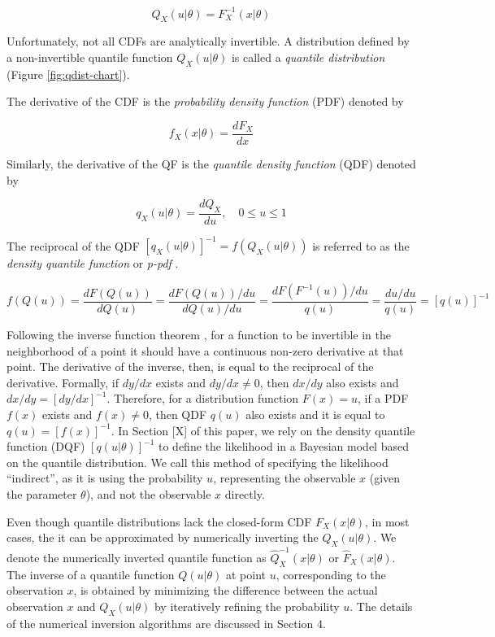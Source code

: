 \documentclass[
  12pt,
]{article}
\begin{document}
\[
Q_X(u | \theta)=F_X^{-1}(x|\theta)
\]

Unfortunately, not all CDFs are analytically invertible. A distribution defined by a non-invertible quantile function \(Q_X(u | \theta)\) is called a \emph{quantile distribution} (Figure \ref{fig:qdist-chart})\citep{gilchrist2000StatisticalModellingQuantile}.

The derivative of the CDF is the \emph{probability density function} (PDF) denoted by

\[
f_X(x | \theta)=\frac{dF_X}{dx}
\]

Similarly, the derivative of the QF is the \emph{quantile density function} (QDF) denoted by

\[
q_X(u|\theta)=\frac{dQ_X}{du}, \quad 0 \leq u \leq 1
\]

The reciprocal of the QDF \([q_X(u|\theta)]^{-1}=f(Q_X(u|\theta))\) is referred to as the \emph{density quantile function} \citep{parzen1980DataModelingUsing} or \emph{p-pdf} \citep{gilchrist2000StatisticalModellingQuantile}.

\[
f(Q(u))=\frac{dF(Q(u))}{dQ(u)} = \frac{dF(Q(u))/du}{dQ(u)/du}=\frac{dF(F^{-1}(u))/du}{q(u)}=\frac{du/du}{q(u)}=[q(u)]^{-1}
\]

Following the inverse function theorem \citep{price1984InverseFunctionTheorem}, for a function to be invertible in the neighborhood of a point it should have a continuous non-zero derivative at that point. The derivative of the inverse, then, is equal to the reciprocal of the derivative. Formally, if \(dy/dx\) exists and \(dy/dx \neq 0\), then \(dx/dy\) also exists and \(dx/dy=[dy/dx]^{-1}\). Therefore, for a distribution function \(F(x)=u\), if a PDF \(f(x)\) exists and \(f(x)\neq0\), then QDF \(q(u)\) also exists and it is equal to \(q(u)=[f(x)]^{-1}\). In Section {[}X{]} of this paper, we rely on the density quantile function (DQF) \([q(u|\theta)]^{-1}\) to define the likelihood in a Bayesian model based on the quantile distribution. We call this method of specifying the likelihood ``indirect'', as it is using the probability \(u\), representing the observable \(x\) (given the parameter \(\theta\)), and not the observable \(x\) directly.

Even though quantile distributions lack the closed-form CDF \(F_X(x|\theta)\), in most cases, the it can be approximated by numerically inverting the \(Q_X(u|\theta)\). We denote the numerically inverted quantile function as \(\widehat{Q}^{-1}_X(x|\theta)\) or \(\widehat{F}_X(x|\theta)\). The inverse of a quantile function \(Q(u|\theta)\) at point \(u\), corresponding to the observation \(x\), is obtained by minimizing the difference between the actual observation \(x\) and \(Q_X(u|\theta)\) by iteratively refining the probability \(u\). The details of the numerical inversion algorithms are discussed in Section 4.
\end{document}
